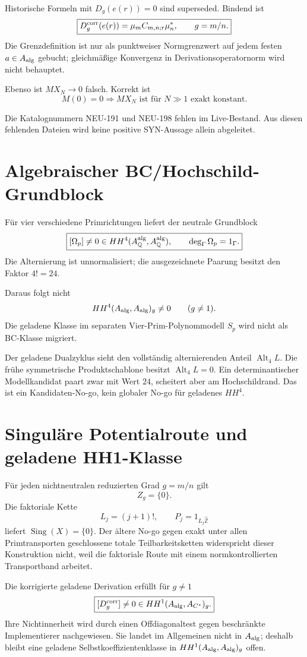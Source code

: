 \documentclass[11pt,a4paper]{article}
\begin{document}
Historische Formeln mit $D_g(e(r))=0$ sind superseded. Bindend ist
\[
 \boxed{D_g^{\rm corr}(e(r))=\mu_m C_{m,n;r}\mu_n^*,\qquad g=m/n.}
\]
Die Grenzdefinition ist nur als punktweiser Normgrenzwert auf jedem festen $a\in A_{\rm alg}$ gebucht; gleichmäßige Konvergenz in Derivationsoperatornorm wird nicht behauptet.

Ebenso ist $MX_N\to0$ falsch. Korrekt ist
\[
 \boxed{M(0)=0\Longrightarrow MX_N\text{ ist für }N\gg1\text{ exakt konstant}.}
\]

Die Katalognummern NEU-191 und NEU-198 fehlen im Live-Bestand. Aus diesen fehlenden Dateien wird keine positive SYN-Aussage allein abgeleitet.

\section{Algebraischer BC/Hochschild-Grundblock}

Für vier verschiedene Primrichtungen liefert der neutrale Grundblock
\[
 \boxed{[\Omega_p]\neq0\in HH^4(A_{\mathbb Q}^{\rm alg},A_{\mathbb Q}^{\rm alg}),
 \qquad \deg_\Gamma\Omega_p=1_\Gamma.}
\]
Die Alternierung ist unnormalisiert; die ausgezeichnete Paarung besitzt den Faktor $4!=24$.

Daraus folgt nicht
\[
 HH^4(A_{\rm alg},A_{\rm alg})_g\neq0\qquad(g\neq1).
\]
Die geladene Klasse im separaten Vier-Prim-Polynommodell $S_p$ wird nicht als BC-Klasse migriert.

Der geladene Dualzyklus sieht den vollständig alternierenden Anteil $\operatorname{Alt}_4L$. Die frühe symmetrische Produktschablone besitzt $\operatorname{Alt}_4L=0$. Ein determinantischer Modellkandidat paart zwar mit Wert $24$, scheitert aber am Hochschildrand. Das ist ein Kandidaten-No-go, kein globaler No-go für geladenes $HH^4$.

\section{Singuläre Potentialroute und geladene HH1-Klasse}

Für jeden nichtneutralen reduzierten Grad $g=m/n$ gilt
\[
 \boxed{Z_g=\{0\}.}
\]
Die faktoriale Kette
\[
 L_j=(j+1)!,\qquad P_j=1_{L_j\widehat{\mathbb Z}}
\]
liefert $\operatorname{Sing}(X)=\{0\}$. Der ältere No-go gegen exakt unter allen Primtransporten geschlossene totale Teilbarkeitsketten widerspricht dieser Konstruktion nicht, weil die faktoriale Route mit einem normkontrollierten Transportband arbeitet.

Die korrigierte geladene Derivation erfüllt für $g\neq1$
\[
 \boxed{[D_g^{\rm corr}]\neq0\in HH^1(A_{\rm alg},A_{C^*})_g.}
\]
Ihre Nichtinnerheit wird durch einen Offdiagonaltest gegen beschränkte Implementierer nachgewiesen. Sie landet im Allgemeinen nicht in $A_{\rm alg}$; deshalb bleibt eine geladene Selbstkoeffizientenklasse in $HH^1(A_{\rm alg},A_{\rm alg})_g$ offen.
\end{document}
